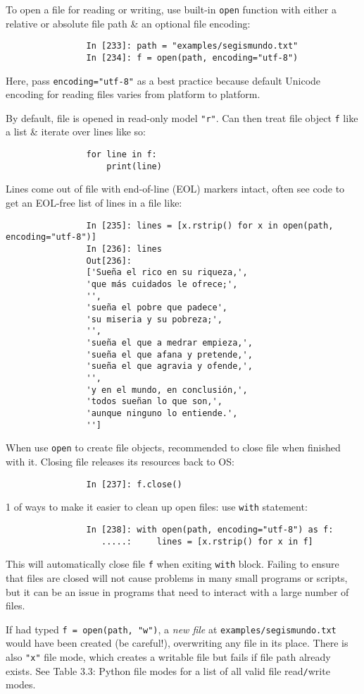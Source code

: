 \documentclass{article}
\begin{document}
\begin{enumerate}
\begin{itemize}
\begin{itemize}
			To open a file for reading or writing, use built-in {\tt open} function with either a relative or absolute file path \& an optional file encoding:
			\begin{verbatim}
				In [233]: path = "examples/segismundo.txt"
				In [234]: f = open(path, encoding="utf-8")
			\end{verbatim}
			Here, pass {\tt encoding="utf-8"} as a best practice because default Unicode encoding for reading files varies from platform to platform.
			
			By default, file is opened in read-only model {\tt"r"}. Can then treat file object {\tt f} like a list \& iterate over lines like so:
			\begin{verbatim}
				for line in f:
				    print(line)
			\end{verbatim}
			Lines come out of file with end-of-line (EOL) markers intact, often see code to get an EOL-free list of lines in a file like:
			\begin{verbatim}
				In [235]: lines = [x.rstrip() for x in open(path, encoding="utf-8")]
				In [236]: lines
				Out[236]:
				['Sueña el rico en su riqueza,',
				'que más cuidados le ofrece;',
				'',
				'sueña el pobre que padece',
				'su miseria y su pobreza;',
				'',
				'sueña el que a medrar empieza,',
				'sueña el que afana y pretende,',
				'sueña el que agravia y ofende,',
				'',
				'y en el mundo, en conclusión,',
				'todos sueñan lo que son,',
				'aunque ninguno lo entiende.',
				'']
			\end{verbatim}
			When use {\tt open} to create file objects, recommended to close file when finished with it. Closing file releases its resources back to OS:
			\begin{verbatim}
				In [237]: f.close()
			\end{verbatim}
			1 of ways to make it easier to clean up open files: use {\tt with} statement:
			\begin{verbatim}
				In [238]: with open(path, encoding="utf-8") as f:
				   .....:     lines = [x.rstrip() for x in f]
			\end{verbatim}
			This will automatically close file {\tt f} when exiting {\tt with} block. Failing to ensure that files are closed will not cause problems in many small programs or scripts, but it can be an issue in programs that need to interact with a large number of files.
			
			If had typed {\tt f = open(path, "w")}, a {\it new file} at {\tt examples/segismundo.txt} would have been created (be careful!), overwriting any file in its place. There is also {\tt"x"} file mode, which creates a writable file but fails if file path already exists. See {\sf Table 3.3: Python file modes} for a list of all valid file read{\tt/}write modes.
			

\end{itemize}
\end{itemize}
\end{enumerate}
\end{document}
